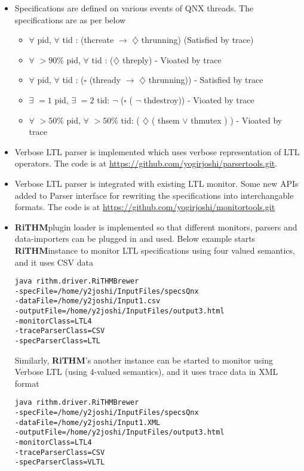 \documentclass[]{article}
\newcommand{\rithm}{\textbf{RiTHM}\space}
\begin{document}
\begin{itemize}
	\item Specifications are defined on various events of QNX threads. The specifications are as per below
	\begin{itemize}
		\item $\forall$  pid, $\forall$ tid : (thcreate $\longrightarrow$  $\diamondsuit$ thrunning)  (Satisfied by trace)
		\item $\forall$ $>90\%$ pid, $\forall$ tid : ($\diamondsuit$ threply) - Vioated by trace
		\item $\forall$  pid, $\forall$ tid : ($\square$ (thready $\longrightarrow$   $\diamondsuit$ thrunning)) - Satisfied by trace
		\item $\exists$ $=1$ pid, $\exists$ $=2$ tid: $\lnot$ ($\square$ ( $\lnot$ thdestroy)) - Vioated by trace
		\item $\forall$ $>50\%$ pid, $\forall$ $>50\%$ tid: ( $\diamondsuit$ ( thsem $\vee$ thmutex ) ) - Vioated by trace
	\end{itemize}
	
\item
Verbose LTL parser is implemented which uses verbose representation of LTL operators. \newline
The code is at \url{https://github.com/yogirjoshi/parsertools.git}.

\item
Verbose LTL parser is integrated with existing LTL monitor. Some new APIs added to Parser interface for rewriting the specifications into interchangable formats. The code is at \url{https://github.com/yogirjoshi/monitortools.git}

\item
\rithm plugin loader is implemented so that different monitors, parsers and data-importers can be plugged in and used. \newline
Below example starts \rithm instance to monitor LTL specifications using four valued semantics, and it uses CSV data
\begin{lstlisting}
java rithm.driver.RiTHMBrewer 
-specFile=/home/y2joshi/InputFiles/specsQnx 
-dataFile=/home/y2joshi/Input1.csv
-outputFile=/home/y2joshi/InputFiles/output3.html 
-monitorClass=LTL4 
-traceParserClass=CSV 
-specParserClass=LTL
\end{lstlisting}
Similarly, \rithm's another instance can be started to monitor using Verbose LTL (using 4-valued semantics), and it uses trace data in XML format 
\begin{lstlisting}
java rithm.driver.RiTHMBrewer 
-specFile=/home/y2joshi/InputFiles/specsQnx 
-dataFile=/home/y2joshi/Input1.XML
-outputFile=/home/y2joshi/InputFiles/output3.html 
-monitorClass=LTL4 
-traceParserClass=CSV 
-specParserClass=VLTL
\end{lstlisting}



\end{itemize}
\end{document}
